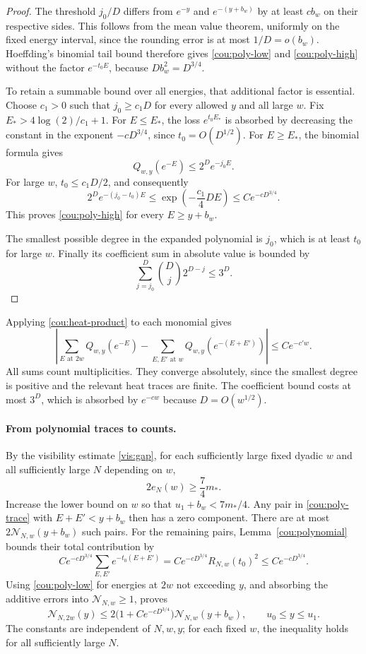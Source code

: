 \begin{proof}
The threshold $j_0/D$ differs from $e^{-y}$ and $e^{-(y+b_w)}$ by at
least $c b_w$ on their respective sides. This follows from the mean value
theorem, uniformly on the fixed energy interval, since the rounding error
is at most $1/D=o(b_w)$. Hoeffding's binomial tail bound
\cite[Theorem~1]{Hoeffding1963} therefore gives \eqref{cou:poly-low} and
\eqref{cou:poly-high} without the factor $e^{-t_0E}$, because
$Db_w^2=D^{3/4}$.

To retain a summable bound over all energies, that additional factor is
essential. Choose $c_1>0$ such that $j_0\ge c_1D$ for every allowed $y$
and all large $w$. Fix $E_*>4\log(2)/c_1+1$.
For $E\le E_*$, the loss $e^{t_0E_*}$ is absorbed by decreasing the
constant in the exponent $-cD^{3/4}$, since $t_0=O(D^{1/2})$.
For $E\ge E_*$, the binomial formula gives
\[
 Q_{w,y}(e^{-E})\le 2^D e^{-j_0E}.
\]
For large $w$, $t_0\le c_1D/2$, and consequently
\[
 2^D e^{-(j_0-t_0)E}
 \le \exp\!\left(-\frac{c_1}{4}DE\right)
 \le Ce^{-cD^{3/4}}.
\]
This proves \eqref{cou:poly-high} for every $E\ge y+b_w$.

The smallest possible degree in the expanded polynomial is $j_0$, which
is at least $t_0$ for large $w$. Finally its coefficient sum in absolute
value is bounded by
\[
 \sum_{j=j_0}^D\binom Dj 2^{D-j}\le3^D.
\]
\end{proof}

Applying \eqref{cou:heat-product} to each monomial gives
\begin{equation}\label{cou:poly-trace}
 \left|
   \sum_{E\text{ at }2w}Q_{w,y}(e^{-E})
   -\sum_{E,E'\text{ at }w}Q_{w,y}(e^{-(E+E')})
 \right|\le Ce^{-c'w}.
\end{equation}
All sums count multiplicities. They converge absolutely, since the
smallest degree is positive and the relevant heat traces are finite.
The coefficient bound costs at most $3^D$, which is absorbed by
$e^{-cw}$ because $D=O(w^{1/2})$.

\paragraph{From polynomial traces to counts.}
By the visibility estimate \eqref{vis:gap}, for each sufficiently large
fixed dyadic $w$ and all sufficiently large $N$ depending on $w$,
\[
 2e_N(w)\ge\frac74m_*.
\]
Increase the lower bound on $w$ so that $u_1+b_w<7m_*/4$. Any pair in
\eqref{cou:poly-trace} with $E+E'<y+b_w$ then has a zero component.
There are at most $2\mathcal N_{N,w}(y+b_w)$ such pairs. For the
remaining pairs, Lemma~\ref{cou:polynomial} bounds their total contribution
by
\[
 Ce^{-cD^{3/4}}\sum_{E,E'}e^{-t_0(E+E')}
 =Ce^{-cD^{3/4}}R_{N,w}(t_0)^2
 \le Ce^{-cD^{3/4}}.
\]
Using \eqref{cou:poly-low} for energies at $2w$ not exceeding $y$, and
absorbing the additive errors into $\mathcal N_{N,w}\ge1$, proves
\begin{equation}\label{cou:recursion}
 \mathcal N_{N,2w}(y)
 \le2\bigl(1+Ce^{-cD^{3/4}}\bigr)
       \mathcal N_{N,w}(y+b_w),
 \qquad u_0\le y\le u_1.
\end{equation}
The constants are independent of $N,w,y$; for each fixed $w$, the
inequality holds for all sufficiently large $N$.

